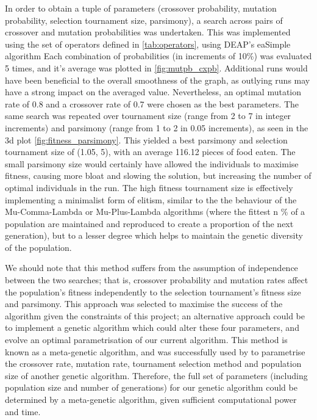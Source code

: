 \documentclass[british,10pt,a4paper]{article}
\begin{document}
In order to obtain a tuple of parameters (crossover probability, mutation probability, selection tournament size, parsimony), a search across pairs of crossover and mutation probabilities was undertaken. This was implemented using the set of operators defined in \autoref{tab:operators}, using DEAP's eaSimple algorithm Each combination of probabilities (in increments of 10\%) was evaluated 5 times, and it's average was plotted in \autoref{fig:mutpb_cxpb}. Additional runs would have been beneficial to the overall smoothness of the graph, as outlying runs may have a strong impact on the averaged value. Nevertheless, an optimal mutation rate of 0.8 and a crossover rate of 0.7 were chosen as the best parameters. The same search was repeated over tournament size (range from 2 to 7 in integer increments) and parsimony (range from 1 to 2 in 0.05 increments), as seen in the 3d plot \autoref{fig:fitness_parsimony}. This yielded a best parsimony and selection tournament size of (1.05, 5), with an average 116.12 pieces of food eaten. The small parsimony size would certainly have allowed the individuals to maximise fitness, causing more bloat and slowing the solution, but increasing the number of optimal individuals in the run. The high fitness tournament size is effectively implementing a minimalist form of elitism, similar to the the behaviour of the Mu-Comma-Lambda or Mu-Plus-Lambda algorithms (where the fittest n \% of a population are maintained and reproduced to create a proportion of the next generation), but to a lesser degree which helps to maintain the genetic diversity of the population.

We should note that this method suffers from the assumption of independence between the two searches; that is, crossover probability and mutation rates affect the population's fitness independently to the selection tournament's fitness size and parsimony. This approach was selected to maximise the success of the algorithm given the constraints of this project; an alternative approach could be to implement a genetic algorithm which could alter these four parameters, and evolve an optimal parametrisation of our current algorithm. This method is known as a meta-genetic algorithm, and was successfully used by \citet{Brain2011-pz} to parametrise the crossover rate, mutation rate, tournament selection method and population size of another genetic algorithm. Therefore, the full set of parameters (including population size and number of generations) for our genetic algorithm could be determined by a meta-genetic algorithm, given sufficient computational power and time.
\end{document}
